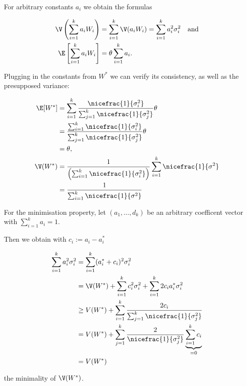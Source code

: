\begin{solution}
    
For arbitrary constants $a_i$ we obtain the formulas

\begin{align*}
  \V\left(\sum_{i=1}^k a_i W_i\right) &= \sum_{i=1}^k \V(a_i W_i)
  = \sum_{i=1}^k a_i^2\sigma_i^2 \quad \text{and} \\
  \E\left[\sum_{i=1}^k a_i W_i\right] &= \theta\sum_{i=1}^k a_i.
\end{align*}

Plugging in the constants from $W^*$ we can verify its
consistency, as well as the presupposed variance:

\begin{align*}
  \E[W^*] &= \sum_{i=1}^k \frac{\nicefrac{1}{\sigma_i^2}}{\sum_{j=1}^k \nicefrac{1}{\sigma_j^2}} \theta \\
  &=  \frac{\sum_{i=1}^k \nicefrac{1}{\sigma_i^2}}{\sum_{j=1}^k \nicefrac{1}{\sigma_j^2}} \theta \\
  &= \theta, \\
  \V(W^*) &= \frac{1}{\left(\sum_{i=1}^k \nicefrac{1}{\sigma_i^2}\right)}
  \sum_{i=1}^k \nicefrac{1}{\sigma^2} \\
  &= \frac{1}{\sum_{i=1}^k \nicefrac{1}{\sigma^2}}
\end{align*}

For the minimisation property, let $(a_1,\dots,d_k)$ be
an arbitrary coefficent vector with $\sum_{i=1}^k a_i = 1$.

Then we obtain with $c_i := a_i - a_i^*$

\begin{align*}
  \sum_{i=1}^k a_i^2 \sigma_i^2 &= 
  \sum_{i=1}^k (a_i^* + c_i)^2 \sigma_i^2 \\
  &= \V(W^*) + \sum_{i=1}^k c_i^2 \sigma_i^2
  + \sum_{i=1}^k 2c_ia_i^* \sigma_i^2 \\
  &\geq V(W^*) + \sum_{i=1}^k \frac{2c_i}{\sum_{j=1}^k \nicefrac{1}{\sigma_j^2}} \\
  &= V(W^*) + \sum_{j=1}^k \frac{2}{\nicefrac{1}{\sigma_j^2}}
  \underbrace{\sum_{i=1}^k c_i}_{=0} \\
  &= V(W^*)
\end{align*}

the minimality of $\V(W^*)$.
    
\end{solution}
    
    